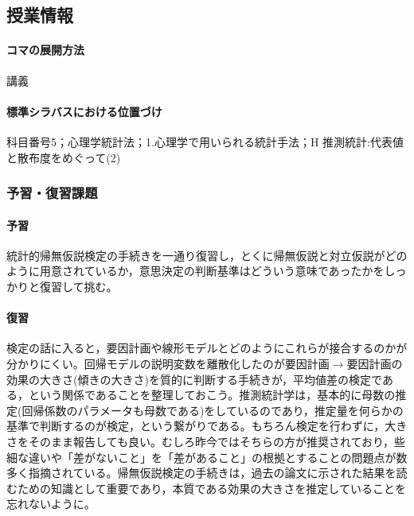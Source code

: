 \subsection{授業情報}
\paragraph{コマの展開方法}
講義
\paragraph{標準シラバスにおける位置づけ}
科目番号5；心理学統計法；1.心理学で用いられる統計手法；H 推測統計:代表値と散布度をめぐって(2)
\subsubsection{予習・復習課題}
\paragraph{予習}
統計的帰無仮説検定の手続きを一通り復習し，とくに帰無仮説と対立仮説がどのように用意されているか，意思決定の判断基準はどういう意味であったかをしっかりと復習して挑む。
\paragraph{復習}
検定の話に入ると，要因計画や線形モデルとどのようにこれらが接合するのかが分かりにくい。回帰モデルの説明変数を離散化したのが要因計画$\to$要因計画の効果の大きさ(傾きの大きさ)を質的に判断する手続きが，平均値差の検定である，という関係であることを整理しておこう。推測統計学は，基本的に母数の推定(回帰係数のパラメータも母数である)をしているのであり，推定量を何らかの基準で判断するのが検定，という繋がりである。もちろん検定を行わずに，大きさをそのまま報告しても良い。むしろ昨今ではそちらの方が推奨されており，些細な違いや「差がないこと」を「差があること」の根拠とすることの問題点が数多く指摘されている。帰無仮説検定の手続きは，過去の論文に示された結果を読むための知識として重要であり，本質である効果の大きさを推定していることを忘れないように。
